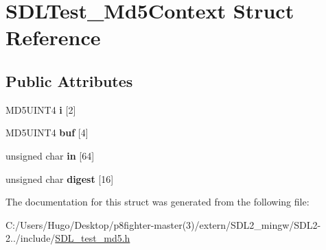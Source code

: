 \hypertarget{struct_s_d_l_test___md5_context}{}\section{S\+D\+L\+Test\+\_\+\+Md5\+Context Struct Reference}
\label{struct_s_d_l_test___md5_context}
\subsection*{Public Attributes}
\begin{DoxyCompactItemize}
\item 
\mbox{\label{struct_s_d_l_test___md5_context_a95b3d5fd74fd1b7a27bf96f3bb32beb4}} 
M\+D5\+U\+I\+N\+T4 {\bfseries i} \mbox{[}2\mbox{]}
\item 
\mbox{\label{struct_s_d_l_test___md5_context_a061f0cead7ec49ac4c5baf0bbd9c13a7}} 
M\+D5\+U\+I\+N\+T4 {\bfseries buf} \mbox{[}4\mbox{]}
\item 
\mbox{\label{struct_s_d_l_test___md5_context_a337638ef799dc0ad9397ea9b175ea388}} 
unsigned char {\bfseries in} \mbox{[}64\mbox{]}
\item 
\mbox{\label{struct_s_d_l_test___md5_context_ab29079997a9f35e5d52c2aac3ad28f90}} 
unsigned char {\bfseries digest} \mbox{[}16\mbox{]}
\end{DoxyCompactItemize}


The documentation for this struct was generated from the following file\+:\begin{DoxyCompactItemize}
\item 
C\+:/\+Users/\+Hugo/\+Desktop/p8fighter-\/master(3)/extern/\+S\+D\+L2\+\_\+mingw/\+S\+D\+L2-\/2../include/\hyperlink{_s_d_l__test__md5_8h}{S\+D\+L\+\_\+test\+\_\+md5.\+h}\end{DoxyCompactItemize}
